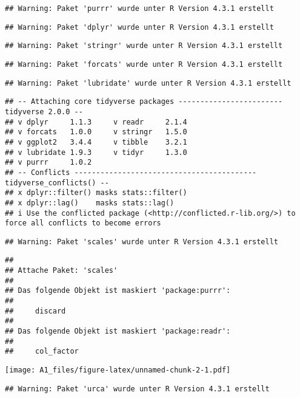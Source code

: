 \documentclass[
]{article}
\begin{document}
\begin{verbatim}
## Warning: Paket 'purrr' wurde unter R Version 4.3.1 erstellt
\end{verbatim}

\begin{verbatim}
## Warning: Paket 'dplyr' wurde unter R Version 4.3.1 erstellt
\end{verbatim}

\begin{verbatim}
## Warning: Paket 'stringr' wurde unter R Version 4.3.1 erstellt
\end{verbatim}

\begin{verbatim}
## Warning: Paket 'forcats' wurde unter R Version 4.3.1 erstellt
\end{verbatim}

\begin{verbatim}
## Warning: Paket 'lubridate' wurde unter R Version 4.3.1 erstellt
\end{verbatim}

\begin{verbatim}
## -- Attaching core tidyverse packages ------------------------ tidyverse 2.0.0 --
## v dplyr     1.1.3     v readr     2.1.4
## v forcats   1.0.0     v stringr   1.5.0
## v ggplot2   3.4.4     v tibble    3.2.1
## v lubridate 1.9.3     v tidyr     1.3.0
## v purrr     1.0.2     
## -- Conflicts ------------------------------------------ tidyverse_conflicts() --
## x dplyr::filter() masks stats::filter()
## x dplyr::lag()    masks stats::lag()
## i Use the conflicted package (<http://conflicted.r-lib.org/>) to force all conflicts to become errors
\end{verbatim}

\begin{verbatim}
## Warning: Paket 'scales' wurde unter R Version 4.3.1 erstellt
\end{verbatim}

\begin{verbatim}
## 
## Attache Paket: 'scales'
## 
## Das folgende Objekt ist maskiert 'package:purrr':
## 
##     discard
## 
## Das folgende Objekt ist maskiert 'package:readr':
## 
##     col_factor
\end{verbatim}

\texttt{[image: A1\_files/figure-latex/unnamed-chunk-2-1.pdf]}

\begin{verbatim}
## Warning: Paket 'urca' wurde unter R Version 4.3.1 erstellt
\end{verbatim}
\end{document}
